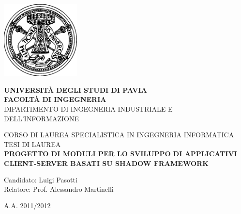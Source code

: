 \frontmatter
\begin{titlepage}
\linespread{1}
	\thispagestyle{empty}
	
	\begin{center}
		\includegraphics[width=4cm]{Immagini/Unipv-logo-vett}
		
		\large
			\textbf{UNIVERSIT\`A DEGLI STUDI DI PAVIA}\\
			\textbf{FACOLT\`A DI INGEGNERIA}\\
		\small 
			DIPARTIMENTO DI INGEGNERIA INDUSTRIALE E DELL'INFORMAZIONE
			\vskip 0.5cm
			
			CORSO DI LAUREA SPECIALISTICA IN INGEGNERIA INFORMATICA
		\vskip 1cm
		\large
		TESI DI LAUREA\\
		\vskip 0.5cm
		\Large
			\textbf{PROGETTO DI MODULI PER LO SVILUPPO DI APPLICATIVI CLIENT-SERVER BASATI SU SHADOW FRAMEWORK}
		\vskip 4cm

		\large
			\begin{flushleft}
				Candidato: Luigi Pasotti\\
				\vskip 0.5cm
				Relatore: Prof. Alessandro Martinelli
			\end{flushleft}

			\vskip 4cm
			A.A. 2011/2012
	\end{center}
	
	\vfill
	\eject
\end{titlepage}
\cleardoublepage 